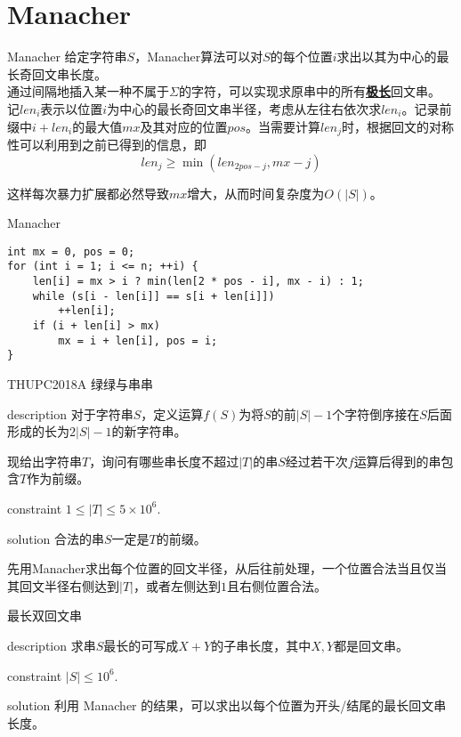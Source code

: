 \documentclass{beamer}
\theoremstyle{compact}
\def\obj#1{\textbf{\uline{#1}}}
\def\le{\leqslant}
\def\ge{\geqslant}
\begin{document}
\section{Manacher}
\begin{frame}{Manacher}
	给定字符串$S$，Manacher算法可以对$S$的每个位置$i$求出以其为中心的最长奇回文串长度。\pause\\
	
	通过间隔地插入某一种不属于$\Sigma$的字符，可以实现求原串中的所有\obj{极长}回文串。\pause\\
	
	记$len_i$表示以位置$i$为中心的最长奇回文串半径，考虑从左往右依次求$len_i$。记录前缀中$i+len_i$的最大值$mx$及其对应的位置$pos$。当需要计算$len_j$时，根据回文的对称性可以利用到之前已得到的信息，即$$len_j \ge \min(len_{2pos-j},mx-j)$$
	
	这样每次暴力扩展都必然导致$mx$增大，从而时间复杂度为$O(|S|)$。
\end{frame}
\begin{frame}[fragile]{Manacher}
\begin{verbatim}
int mx = 0, pos = 0;
for (int i = 1; i <= n; ++i) {
    len[i] = mx > i ? min(len[2 * pos - i], mx - i) : 1;
    while (s[i - len[i]] == s[i + len[i]])
        ++len[i];
    if (i + len[i] > mx)
        mx = i + len[i], pos = i;
}
\end{verbatim}
\end{frame}
\begin{frame}{THUPC2018A 绿绿与串串}
	\begin{block}{description}
		对于字符串$S$，定义运算$f(S)$为将$S$的前$|S|-1$个字符倒序接在$S$后面形成的长为$2|S|-1$的新字符串。
		
		现给出字符串$T$，询问有哪些串长度不超过$|T|$的串$S$经过若干次$f$运算后得到的串包含$T$作为前缀。
	\end{block}
	\begin{block}{constraint}
		$1 \le |T| \le 5 \times 10^6.$
	\end{block}
	\pause
	\begin{block}{solution}
		合法的串$S$一定是$T$的前缀。
		
		先用Manacher求出每个位置的回文半径，从后往前处理，一个位置合法当且仅当其回文半径右侧达到$|T|$，或者左侧达到$1$且右侧位置合法。
	\end{block}
\end{frame}
\begin{frame}{最长双回文串}
	\begin{block}{description}
		求串$S$最长的可写成$X + Y$的子串长度，其中$X, Y$都是回文串。
	\end{block}
	\begin{block}{constraint}
		$|S| \le 10^6.$
	\end{block}
	\pause
	\begin{block}{solution}
		利用 Manacher 的结果，可以求出以每个位置为开头/结尾的最长回文串长度。
	\end{block}
\end{frame}
\end{document}
